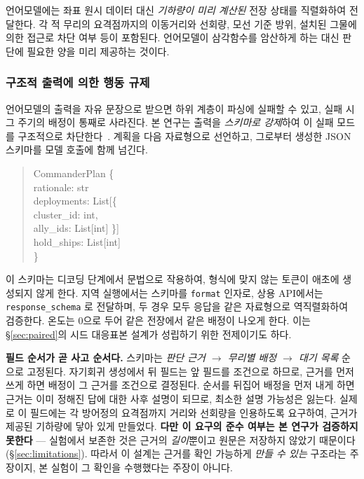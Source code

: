 언어모델에는 좌표 원시 데이터 대신 \emph{기하량이 미리 계산된} 전장 상태를 직렬화하여
전달한다. 각 적 무리의 요격점까지의 이동거리와 선회량, 모선 기준
방위, 설치된 그물에 의한 접근로 차단 여부 등이 포함된다. 언어모델이 삼각함수를 암산하게
하는 대신 판단에 필요한 양을 미리 제공하는 것이다.

\subsubsection{구조적 출력에 의한 행동 규제}
\label{sec:schema}

언어모델의 출력을 자유 문장으로 받으면 하위 계층이 파싱에 실패할 수 있고, 실패 시 그
주기의 배정이 통째로 사라진다. 본 연구는 출력을 \emph{스키마로 강제}하여 이 실패 모드를
구조적으로 차단한다~\citep{openai2026function}. 계획을 다음 자료형으로 선언하고, 그로부터 생성한
JSON 스키마를 모델 호출에 함께 넘긴다.

\begin{quote}\ttfamily\scriptsize\setlength{\parindent}{0pt}
CommanderPlan \{\\
\hspace*{1.2em} rationale: str\\
\hspace*{1.2em} deployments: List[\{\\
\hspace*{3.0em} cluster\_id: int,\\
\hspace*{3.0em} ally\_ids: List[int] \}]\\
\hspace*{1.2em} hold\_ships: List[int]\\
\}
\end{quote}

이 스키마는 디코딩 단계에서 문법으로 작용하여, 형식에 맞지 않는 토큰이 애초에 생성되지
않게 한다. 지역 실행에서는 스키마를 \texttt{format} 인자로, 상용 API에서는
\texttt{response\_schema} 로 전달하며, 두 경우 모두 응답을 같은 자료형으로 역직렬화하여
검증한다. 온도는 0으로 두어 같은 전장에서 같은 배정이 나오게 한다. 이는 \S\ref{sec:paired}의
시드 대응표본 설계가 성립하기 위한 전제이기도 하다.

\textbf{필드 순서가 곧 사고 순서다.} 스키마는 \emph{판단 근거 $\to$ 무리별 배정 $\to$ 대기
목록} 순으로 고정된다. 자기회귀 생성에서 뒤 필드는 앞 필드를 조건으로 하므로, 근거를 먼저
쓰게 하면 배정이 그 근거를 조건으로 결정된다. 순서를 뒤집어 배정을 먼저 내게 하면 근거는
이미 정해진 답에 대한 사후 설명이 되므로, 최소한 설명 가능성은 잃는다. 실제로 이
필드에는 각 방어정의 요격점까지 거리와 선회량을 인용하도록 요구하여, 근거가 제공된 기하량에
닿아 있게 만들었다. \textbf{다만 이 요구의 준수 여부는 본 연구가 검증하지 못한다} --- 실험에서
보존한 것은 근거의 \emph{길이}뿐이고 원문은 저장하지 않았기 때문이다(\S\ref{sec:limitations}).
따라서 이 설계는 근거를 확인 가능하게 \emph{만들 수 있는} 구조라는 주장이지, 본 실험이 그
확인을 수행했다는 주장이 아니다.

